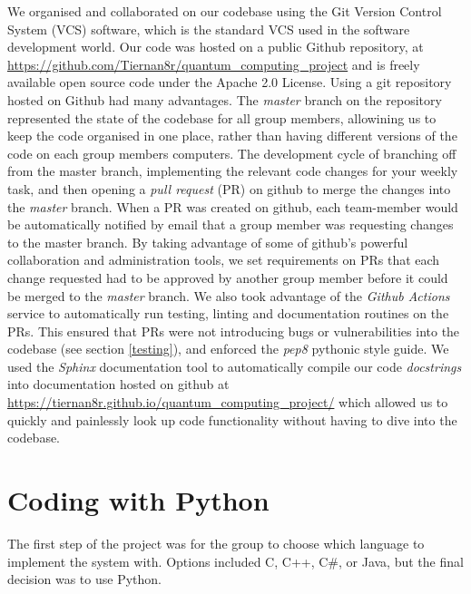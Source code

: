 \documentclass{article}
\begin{document}
We organised and collaborated on our codebase using the Git\cite{noauthor_git_nodate} Version Control System (VCS) software, which is the standard VCS used in the software development world.
Our code was hosted on a public Github\cite{noauthor_build_nodate} repository, at \url{https://github.com/Tiernan8r/quantum_computing_project} and is freely available open source code under the Apache 2.0 License\cite{noauthor_apache_nodate}.
Using a git repository hosted on Github had many advantages. The \textit{master} branch on the repository represented the state of the codebase for all group members, allowining us to keep the code organised in one place, rather than having different versions of the code on each group members computers.
The development cycle of branching off from the master branch, implementing the relevant code changes for your weekly task, and then opening a \textit{pull request} (PR) on github to merge the changes into the \textit{master} branch. 
When a PR was created on github, each team-member would be automatically notified by email that a group member was requesting changes to the master branch.
By taking advantage of some of github's powerful collaboration and administration tools, we set requirements on PRs that each change requested had to be approved by another group member before it could be merged to the \textit{master} branch.
We also took advantage of the \textit{Github Actions} service to automatically run testing, linting and documentation routines on the PRs. 
This ensured that PRs were not introducing bugs or vulnerabilities into the codebase (see section \ref{testing}), and enforced the \textit{pep8}\cite{noauthor_pep_nodate} pythonic style guide. 
We used the \textit{Sphinx}\cite{noauthor_overview_nodate} documentation tool to automatically compile our code \textit{docstrings} into documentation hosted on github at \url{https://tiernan8r.github.io/quantum_computing_project/} which allowed us to quickly and painlessly look up code functionality without having to dive into the codebase.

\pagebreak

\section{Coding with Python}

The first step of the project was for the group to choose which language to implement the system with.
Options included C, C++, C#, or Java, but the final decision was to use Python.

\medskip
\end{document}
